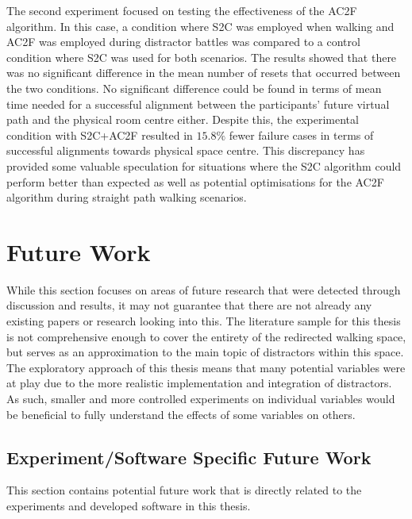 The second experiment focused on testing the effectiveness of the AC2F algorithm. In this case, a condition where S2C was employed when walking and AC2F was employed during distractor battles was compared to a control condition where S2C was used for both scenarios. The results showed that there was no significant difference in the mean number of resets that occurred between the two conditions. No significant difference could be found in terms of mean time needed for a successful alignment between the participants' future virtual path and the physical room centre either. Despite this, the experimental condition with S2C+AC2F resulted in $15.8\%$ fewer failure cases in terms of successful alignments towards physical space centre. This discrepancy has provided some valuable speculation for situations where the S2C algorithm could perform better than expected as well as potential optimisations for the AC2F algorithm during straight path walking scenarios. 

\iffalse
   * This has provided insights for more predictive algorithms that it may not always be ideal to align towards centre. Depends whether they switch between algorithms or not though
\fi

\section{Future Work}\label{sec:futurework}
While this section focuses on areas of future research that were detected through discussion and results, it may not guarantee that there are not already any existing papers or research looking into this. The literature sample for this thesis is not comprehensive enough to cover the entirety of the redirected walking space, but serves as an approximation to the main topic of distractors within this space. The exploratory approach of this thesis means that many potential variables were at play due to the more realistic implementation and integration of distractors. As such, smaller and more controlled experiments on individual variables would be beneficial to fully understand the effects of some variables on others.

\subsection{Experiment/Software Specific Future Work}
This section contains potential future work that is directly related to the experiments and developed software in this thesis.

